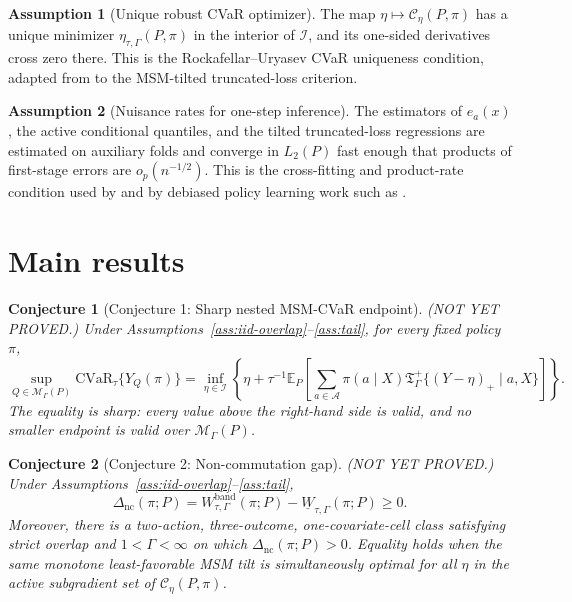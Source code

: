 \documentclass[11pt]{article}
\newcommand{\E}{\mathbb{E}}
\theoremstyle{definition}
\newtheorem{assumption}{Assumption}
\theoremstyle{plain}
\newtheorem{conjecture}{Conjecture}
\theoremstyle{remark}
\begin{document}
\begin{assumption}[Unique robust CVaR optimizer]\label{ass:unique-eta}
The map \(\eta\mapsto \mathcal C_\eta(P,\pi)\) has a unique minimizer \(\eta_{\tau,\Gamma}(P,\pi)\) in the interior of \(\mathcal I\), and its one-sided derivatives cross zero there.  This is the Rockafellar--Uryasev CVaR uniqueness condition, adapted from \citet{RockafellarUryasev2000CVaR} to the MSM-tilted truncated-loss criterion.
\end{assumption}

\begin{assumption}[Nuisance rates for one-step inference]\label{ass:nuisance}
The estimators of \(e_a(x)\), the active conditional quantiles, and the tilted truncated-loss regressions are estimated on auxiliary folds and converge in \(L_2(P)\) fast enough that products of first-stage errors are \(o_p(n^{-1/2})\).  This is the cross-fitting and product-rate condition used by \citet{DornGuoKallus2021DoublySharp} and by debiased policy learning work such as \citet{FanQiXu2025AlphaExpectedWelfare}.
\end{assumption}

\section{Main results}
\begin{conjecture}[Conjecture 1: Sharp nested MSM-CVaR endpoint]\label{conj:nested-endpoint}
(NOT YET PROVED.)  Under Assumptions~\ref{ass:iid-overlap}--\ref{ass:tail}, for every fixed policy \(\pi\),
\[
\sup_{Q\in\mathcal M_\Gamma(P)}
\mathrm{CVaR}_\tau\{Y_Q(\pi)\}
=
\inf_{\eta\in\mathcal I}
\left\{\eta+\tau^{-1}\E_P\left[
\sum_{a\in\mathcal A}\pi(a\mid X)
\mathfrak T_{\Gamma}^{+}\{(Y-\eta)_+\mid a,X\}
\right]\right\}.
\]
The equality is sharp: every value above the right-hand side is valid, and no smaller endpoint is valid over \(\mathcal M_\Gamma(P)\).
\end{conjecture}

\begin{conjecture}[Conjecture 2: Non-commutation gap]\label{conj:noncommutation}
(NOT YET PROVED.)  Under Assumptions~\ref{ass:iid-overlap}--\ref{ass:tail},
\[
\Delta_{\mathrm{nc}}(\pi;P)=
W_{\tau,\Gamma}^{\mathrm{band}}(\pi;P)
-\underline W_{\tau,\Gamma}(\pi;P)\geq 0.
\]
Moreover, there is a two-action, three-outcome, one-covariate-cell class satisfying strict overlap and \(1<\Gamma<\infty\) on which \(\Delta_{\mathrm{nc}}(\pi;P)>0\).  Equality holds when the same monotone least-favorable MSM tilt is simultaneously optimal for all \(\eta\) in the active subgradient set of \(\mathcal C_\eta(P,\pi)\).
\end{conjecture}
\end{document}
